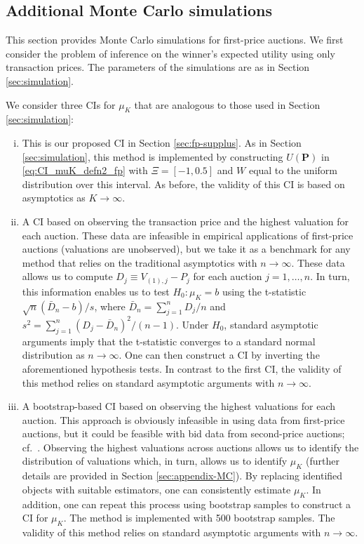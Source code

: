 \subsection{Additional Monte Carlo simulations}\label{sec:simulation-fp}

This section provides Monte Carlo simulations for first-price auctions. We first consider the problem of inference on the winner's expected utility using only transaction prices. The parameters of the simulations are as in Section \ref{sec:simulation}.

We consider three CIs for $\mu _{K}$ that are analogous to those used in Section \ref{sec:simulation}:
\begin{enumerate}[(i)]
    \item This is our proposed CI in Section \ref{sec:fp-supplus}. As in Section \ref{sec:simulation}, this method is implemented by constructing $U( \mathbf{P})$ in \eqref{eq:CI_muK_defn2_fp} with $\Xi =[ -1,0.5] $ and $W$ equal to the uniform distribution over this interval. As before, the validity of this CI is based on asymptotics as $K\to\infty$.
    \item A CI based on observing the transaction price and the highest valuation for each auction. These data are infeasible in empirical applications of first-price auctions (valuations are unobserved), but we take it as a benchmark for any method that relies on the traditional asymptotics with $n\to \infty$. These data allows us to compute $D_{j}\equiv V_{(1),j}-P_{j}$ for each auction $j=1,\dots,n$. In turn, this information enables us to test $H_0:\mu_{K} = b$ using the t-statistic $\sqrt{n}(\bar{D}_{n} - b)/s$, where $\bar{D}_{n}=\sum_{j=1}^n D_{j}/n$ and $s^2 = {\sum^{n}_{j=1} ( D_{j}-\bar{D}_{n}) ^{2}/(n-1)}$. Under $H_0$, standard asymptotic arguments imply that the t-statistic converges to a standard normal distribution as $n\to\infty$. One can then construct a CI by inverting the aforementioned hypothesis tests. In contrast to the first CI, the validity of this method relies on standard asymptotic arguments with $n\to\infty$.
    \item A bootstrap-based CI based on observing the highest valuations for each auction. This approach is obviously infeasible in using data from first-price auctions, but it could be feasible with bid data from second-price auctions; cf.\ \cite{menzel2013}. Observing the highest valuations across auctions allows us to identify the distribution of valuations which, in turn, allows us to identify $\mu_K$ (further details are provided in Section \ref{sec:appendix-MC}). By replacing identified objects with suitable estimators, one can consistently estimate $\mu_K$. In addition, one can repeat this process using bootstrap samples to construct a CI for $\mu _{K}$. The method is implemented with 500 bootstrap samples. The validity of this method relies on standard asymptotic arguments with $n\to\infty$.
\end{enumerate}

